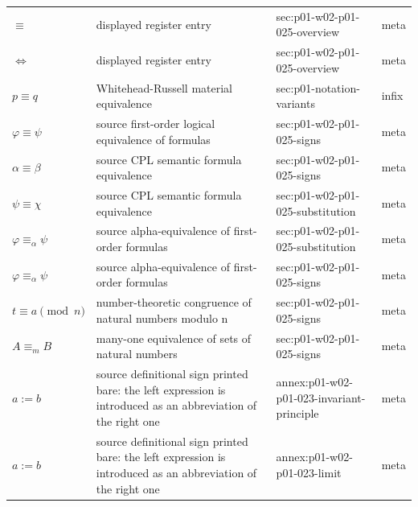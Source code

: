 \begin{longtable}{@{}p{}p{}p{}p{}@{}}
\(\equiv\) & displayed register entry & sec:\allowbreak{}p01-\allowbreak{}w02-\allowbreak{}p01-\allowbreak{}025-\allowbreak{}overview & meta \\
\(\Leftrightarrow\) & displayed register entry & sec:\allowbreak{}p01-\allowbreak{}w02-\allowbreak{}p01-\allowbreak{}025-\allowbreak{}overview & meta \\
\(p\equiv q\) & Whitehead-Russell material equivalence & sec:\allowbreak{}p01-\allowbreak{}notation-\allowbreak{}variants & infix \\
\(\varphi\equiv\psi\) & source first-order logical equivalence of formulas & sec:\allowbreak{}p01-\allowbreak{}w02-\allowbreak{}p01-\allowbreak{}025-\allowbreak{}signs & meta \\
\(\alpha\equiv\beta\) & source CPL semantic formula equivalence & sec:\allowbreak{}p01-\allowbreak{}w02-\allowbreak{}p01-\allowbreak{}025-\allowbreak{}signs & meta \\
\(\psi\equiv\chi\) & source CPL semantic formula equivalence & sec:\allowbreak{}p01-\allowbreak{}w02-\allowbreak{}p01-\allowbreak{}025-\allowbreak{}substitution & meta \\
\(\varphi\equiv_\alpha\psi\) & source alpha-equivalence of first-order formulas & sec:\allowbreak{}p01-\allowbreak{}w02-\allowbreak{}p01-\allowbreak{}025-\allowbreak{}substitution & meta \\
\(\varphi\equiv_\alpha\psi\) & source alpha-equivalence of first-order formulas & sec:\allowbreak{}p01-\allowbreak{}w02-\allowbreak{}p01-\allowbreak{}025-\allowbreak{}signs & meta \\
\(t\equiv a\pmod n\) & number-theoretic congruence of natural numbers modulo n & sec:\allowbreak{}p01-\allowbreak{}w02-\allowbreak{}p01-\allowbreak{}025-\allowbreak{}signs & meta \\
\(A\equiv_m B\) & many-one equivalence of sets of natural numbers & sec:\allowbreak{}p01-\allowbreak{}w02-\allowbreak{}p01-\allowbreak{}025-\allowbreak{}signs & meta \\
\(a:=b\) & source definitional sign printed bare: the left expression is introduced as an abbreviation of the right one & annex:\allowbreak{}p01-\allowbreak{}w02-\allowbreak{}p01-\allowbreak{}023-\allowbreak{}invariant-\allowbreak{}principle & meta \\
\(a:=b\) & source definitional sign printed bare: the left expression is introduced as an abbreviation of the right one & annex:\allowbreak{}p01-\allowbreak{}w02-\allowbreak{}p01-\allowbreak{}023-\allowbreak{}limit & meta \\

\end{longtable}
